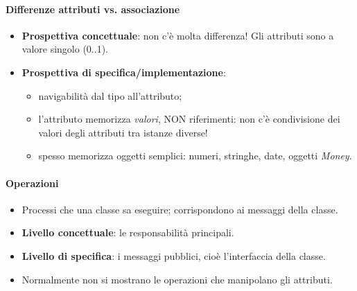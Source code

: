 \documentclass[a4paper,12pt]{article}
\begin{document}
\paragraph{Differenze attributi vs. associazione}
\begin{itemize}
  \item \textbf{Prospettiva concettuale}: non c'è molta differenza! Gli attributi sono
        a valore singolo (0..1).
  \item \textbf{Prospettiva di specifica/implementazione}:
  \begin{itemize}
    \item navigabilità dal tipo all'attributo;
    \item l'attributo memorizza \emph{valori}, NON riferimenti: non c'è condivisione dei
          valori degli attributi tra istanze diverse!
    \item spesso memorizza oggetti semplici: numeri, stringhe, date, oggetti
          \emph{Money}.
  \end{itemize}
\end{itemize}
\paragraph{Operazioni}
\begin{itemize}
  \item Processi che una classe sa eseguire; corrispondono ai messaggi della classe.
  \item \textbf{Livello concettuale}: le responsabilità principali.
  \item \textbf{Livello di specifica}: i messaggi pubblici, cioè l'interfaccia della classe.
  \item Normalmente non si mostrano le operazioni che manipolano gli attributi.
\end{itemize}
\end{document}
